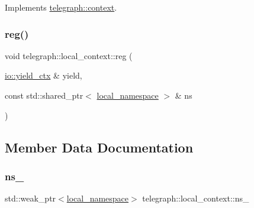 Implements \hyperlink{classtelegraph_1_1context_a2f6c9ecc15cee66415828df9efa834a2}{telegraph\+::context}.

\mbox{\label{classtelegraph_1_1local__context_ab64632b088982a5f994708db99690f4f}} 
\subsubsection{\texorpdfstring{reg()}{reg()}}
{\footnotesize\ttfamily void telegraph\+::local\+\_\+context\+::reg (\begin{DoxyParamCaption}\item[{\hyperlink{structboost_1_1asio_1_1yield__ctx}{io\+::yield\+\_\+ctx} \&}]{yield,  }\item[{const std\+::shared\+\_\+ptr$<$ \hyperlink{classtelegraph_1_1local__namespace}{local\+\_\+namespace} $>$ \&}]{ns }\end{DoxyParamCaption})}



\subsection{Member Data Documentation}
\mbox{\label{classtelegraph_1_1local__context_a4ad057dd5bede6236b3af44a18577831}} 
\subsubsection{\texorpdfstring{ns\+\_\+}{ns\_}}
{\footnotesize\ttfamily std\+::weak\+\_\+ptr$<$\hyperlink{classtelegraph_1_1local__namespace}{local\+\_\+namespace}$>$ telegraph\+::local\+\_\+context\+::ns\+\_\+\hspace{0.3cm}{\ttfamily [protected]}}

\mbox{\label{classtelegraph_1_1local__context_a16ab8680bd633b8b8554960bb8c48498}} 
